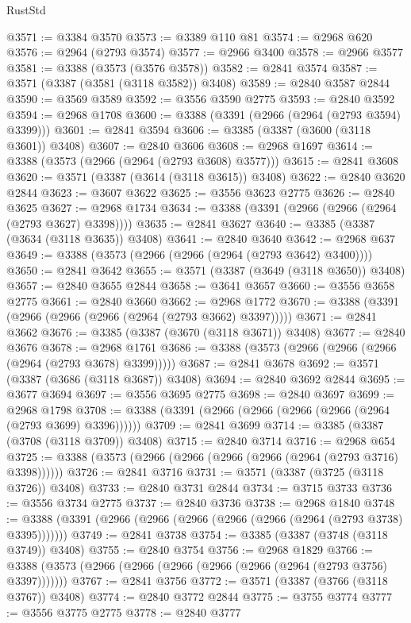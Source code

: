 \begin{lexlean}{RustStd}
\begin{coremodule}
@3571 := @3384 @3570
@3573 := @3389 @110 @81
@3574 := @2968 @620
@3576 := @2964 (@2793 @3574)
@3577 := @2966 @3400
@3578 := @2966 @3577
@3581 := @3388 (@3573 (@3576 @3578))
@3582 := @2841 @3574
@3587 := @3571 (@3387 (@3581 (@3118 @3582)) @3408)
@3589 := @2840 @3587 @2844
@3590 := @3569 @3589
@3592 := @3556 @3590 @2775
@3593 := @2840 @3592
@3594 := @2968 @1708
@3600 := @3388 (@3391 (@2966 (@2964 (@2793 @3594) @3399)))
@3601 := @2841 @3594
@3606 := @3385 (@3387 (@3600 (@3118 @3601)) @3408)
@3607 := @2840 @3606
@3608 := @2968 @1697
@3614 := @3388 (@3573 (@2966 (@2964 (@2793 @3608) @3577)))
@3615 := @2841 @3608
@3620 := @3571 (@3387 (@3614 (@3118 @3615)) @3408)
@3622 := @2840 @3620 @2844
@3623 := @3607 @3622
@3625 := @3556 @3623 @2775
@3626 := @2840 @3625
@3627 := @2968 @1734
@3634 := @3388 (@3391 (@2966 (@2966 (@2964 (@2793 @3627) @3398))))
@3635 := @2841 @3627
@3640 := @3385 (@3387 (@3634 (@3118 @3635)) @3408)
@3641 := @2840 @3640
@3642 := @2968 @637
@3649 := @3388 (@3573 (@2966 (@2966 (@2964 (@2793 @3642) @3400))))
@3650 := @2841 @3642
@3655 := @3571 (@3387 (@3649 (@3118 @3650)) @3408)
@3657 := @2840 @3655 @2844
@3658 := @3641 @3657
@3660 := @3556 @3658 @2775
@3661 := @2840 @3660
@3662 := @2968 @1772
@3670 := @3388 (@3391 (@2966 (@2966 (@2966 (@2964 (@2793 @3662) @3397)))))
@3671 := @2841 @3662
@3676 := @3385 (@3387 (@3670 (@3118 @3671)) @3408)
@3677 := @2840 @3676
@3678 := @2968 @1761
@3686 := @3388 (@3573 (@2966 (@2966 (@2966 (@2964 (@2793 @3678) @3399)))))
@3687 := @2841 @3678
@3692 := @3571 (@3387 (@3686 (@3118 @3687)) @3408)
@3694 := @2840 @3692 @2844
@3695 := @3677 @3694
@3697 := @3556 @3695 @2775
@3698 := @2840 @3697
@3699 := @2968 @1798
@3708 := @3388 (@3391 (@2966 (@2966 (@2966 (@2966 (@2964 (@2793 @3699) @3396))))))
@3709 := @2841 @3699
@3714 := @3385 (@3387 (@3708 (@3118 @3709)) @3408)
@3715 := @2840 @3714
@3716 := @2968 @654
@3725 := @3388 (@3573 (@2966 (@2966 (@2966 (@2966 (@2964 (@2793 @3716) @3398))))))
@3726 := @2841 @3716
@3731 := @3571 (@3387 (@3725 (@3118 @3726)) @3408)
@3733 := @2840 @3731 @2844
@3734 := @3715 @3733
@3736 := @3556 @3734 @2775
@3737 := @2840 @3736
@3738 := @2968 @1840
@3748 := @3388 (@3391 (@2966 (@2966 (@2966 (@2966 (@2966 (@2964 (@2793 @3738) @3395)))))))
@3749 := @2841 @3738
@3754 := @3385 (@3387 (@3748 (@3118 @3749)) @3408)
@3755 := @2840 @3754
@3756 := @2968 @1829
@3766 := @3388 (@3573 (@2966 (@2966 (@2966 (@2966 (@2966 (@2964 (@2793 @3756) @3397)))))))
@3767 := @2841 @3756
@3772 := @3571 (@3387 (@3766 (@3118 @3767)) @3408)
@3774 := @2840 @3772 @2844
@3775 := @3755 @3774
@3777 := @3556 @3775 @2775
@3778 := @2840 @3777

\end{coremodule}
\end{lexlean}
